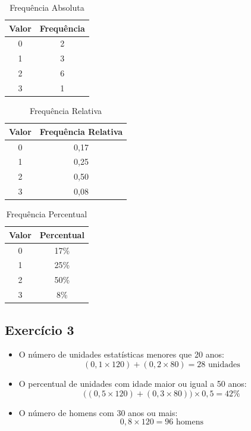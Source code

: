 \documentclass[12pt,a4paper]{article}
\begin{document}
\begin{table}[H]
\centering
\caption*{Frequência Absoluta}
\renewcommand{\arraystretch}{1.2}
\begin{tabular}{|c|c|}
\hline
Valor & Frequência \\ \hline
0 & 2 \\ \hline
1 & 3 \\ \hline
2 & 6 \\ \hline
3 & 1 \\ \hline
\end{tabular}
\end{table}

\begin{table}[H]
\centering
\caption*{Frequência Relativa}
\renewcommand{\arraystretch}{1.2}
\begin{tabular}{|c|c|}
\hline
Valor & Frequência Relativa \\ \hline
0 & 0,17 \\ \hline
1 & 0,25 \\ \hline
2 & 0,50 \\ \hline
3 & 0,08 \\ \hline
\end{tabular}
\end{table}

\begin{table}[H]
\centering
\caption*{Frequência Percentual}
\renewcommand{\arraystretch}{1.2}
\begin{tabular}{|c|c|}
\hline
Valor & Percentual \\ \hline
0 & 17\% \\ \hline
1 & 25\% \\ \hline
2 & 50\% \\ \hline
3 & 8\% \\ \hline
\end{tabular}
\end{table}

\subsection*{Exercício 3}
\begin{itemize}
    \item O número de unidades estatísticas menores que 20 anos: 
    \[
    (0,1 \times 120) + (0,2 \times 80) = 28 \text{ unidades}
    \]
    \item O percentual de unidades com idade maior ou igual a 50 anos: 
    \[
    \big((0,5 \times 120) + (0,3 \times 80)\big) \times 0,5 = 42\%
    \]
    \item O número de homens com 30 anos ou mais: 
    \[
    0,8 \times 120 = 96 \text{ homens}
    \]
\end{itemize}
\end{document}
